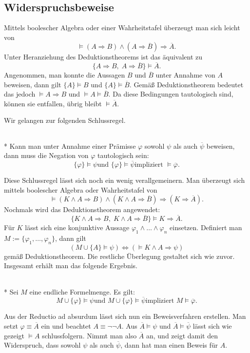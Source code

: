 \newpage
\subsection{Widerspruchsbeweise}
Mittels boolescher Algebra oder einer Wahrheitstafel überzeugt man
sich leicht von
\[\models (A\Rightarrow B)\land (A\Rightarrow\overline B)\Rightarrow\overline A.\]
Unter Heranziehung des Deduktionstheorems ist das äquivalent zu
\[\{A\Rightarrow B,\;A\Rightarrow\overline B\}\models\overline A.\]
Angenommen, man konnte die Aussagen $B$ und $\overline B$
unter Annahme von $A$ beweisen, dann gilt $\{A\}\models B$
und $\{A\}\models\overline B$. Gemäß Deduktionstheorem
bedeutet das jedoch $\models A\Rightarrow B$ und
$\models A\models\overline B$. Da diese Bedingungen tautologisch
sind, können sie entfallen, übrig bleibt $\models\overline A$.

Wir gelangen zur folgenden Schlussregel.

\begin{Satz}\mbox{}\\*
Kann man unter Annahme einer Prämisse $\varphi$ sowohl
$\psi$ als auch $\overline\psi$ beweisen, dann muss
die Negation von $\varphi$ tautologisch sein:
\[\text{$\{\varphi\}\models\psi$
und $\{\varphi\}\models\overline\psi$
impliziert $\models\overline\varphi$}.\]
\end{Satz}

\noindent
Diese Schlussregel lässt sich noch ein wenig verallgemeinern.
Man überzeugt sich mittels boolescher Algebra oder Wahrheitstafel von
\[\models (K\land A\Rightarrow B)\land (K\land A\Rightarrow\overline B)
\Rightarrow (K\Rightarrow\overline A).\]
Nochmals wird das Deduktionstheorem angewendet:
\[\{K\land A\Rightarrow B,\;K\land A\Rightarrow\overline B\}
\models K\Rightarrow\overline A.\]
Für $K$ lässt sich eine konjunktive Aussage
$\varphi_1\land\ldots\land\varphi_n$ einsetzen.
Definiert man $M:=\{\varphi_1,\ldots,\varphi_n\}$, dann gilt
\[(M\cup\{A\}\models\psi)\iff (\models K\land A\Rightarrow\psi)\]
gemäß Deduktionstheorem. Die restliche Überlegung gestaltet
sich wie zuvor. Insgesamt erhält man das folgende Ergebnis.
\begin{Satz}\mbox{}\\*
Sei $M$ eine endliche Formelmenge. Es gilt:
\[\text{$M\cup\{\varphi\}\models\psi$
und $M\cup\{\varphi\}\models\overline\psi$
impliziert $M\models\overline\varphi$}.\]
\end{Satz}

\noindent
Aus der Reductio ad absurdum lässt sich nun ein
Beweisverfahren erstellen. Man setzt $\varphi\equiv\overline A$ ein
und beachtet $A\equiv\neg\neg A$. Aus $\overline A\models\psi$
und $\overline A\models\overline\psi$ lässt sich wie gezeigt
$\models A$ schlussfolgern. Nimmt man also $\overline A$ an,
und zeigt damit den Widerspruch, dass sowohl $\psi$ als auch
$\overline\psi$, dann hat man einen Beweis für $A$.

